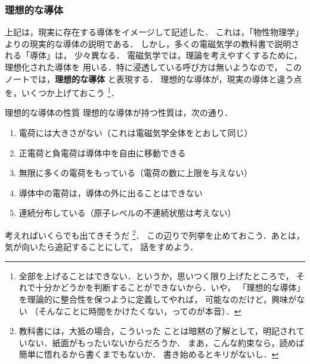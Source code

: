         \subsubsection{理想的な導体}
            上記は，現実に存在する導体をイメージして記述した．
            これは，「物性物理学」よりの現実的な導体の説明である．
            しかし，多くの電磁気学の教科書で説明される「導体」は，
            少々異なる．
            電磁気学では，理論を考えやすくするために，理想化された導体を
            用いる．特に浸透している呼び方は無いようなので，
            このノートでは，\textbf{理想的な導体} と表現する．
            理想的な導体が，現実の導体と違う点を，いくつか上げておこう
                \footnote{
                    全部を上げることはできない．というか，思いつく限り上げたところで，
                    それで十分かどうかを判断することができないから．いや，
                    「理想的な導体」を理論的に整合性を保つように定義してやれば，
                    可能なのだけど，興味がない
                    （そんなことに時間をかけたくない，ってのが本音）．
                }．
            \begin{myshadebox}{理想的な導体の性質}
                理想的な導体が持つ性質は，次の通り．
                \begin{enumerate}
                    \item 電荷には大きさがない（これは電磁気学全体をとおして同じ）
                    \item 正電荷と負電荷は導体中を自由に移動できる
                    \item 無限に多くの電荷をもっている（電荷の数に上限を与えない）
                    \item 導体中の電荷は，導体の外に出ることはできない
                    \item 連続分布している（原子レベルの不連続状態は考えない）
                \end{enumerate}
            \end{myshadebox}

            考えればいくらでも出てきそうだ
                \footnote{
                    教科書には，大抵の場合，こういった
                    ことは暗黙の了解として，明記されていない．紙面がもったいないからだろうか．
                    まあ，こんな約束なら，読めば簡単に悟れるから書くまでもないか．
                    書き始めるとキリがないし．
                }．
            この辺りで列挙を止めておこう．あとは，気が向いたら追記することにして，
            話をすめよう．

